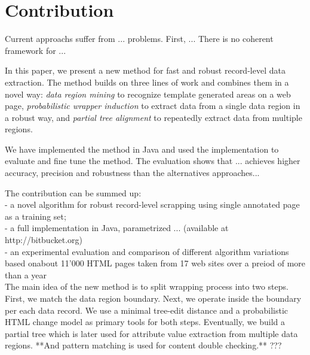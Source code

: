 \section{Contribution}



Current approachs suffer from ... problems. First, ... There is no coherent framework for ...

In this paper, we present a new method for fast and robust record-level data extraction. The method builds on three lines of work and combines them in a novel way: \emph{data region mining} \cite{liu2009a} to recognize template generated areas on a web page, \emph{probabilistic wrapper induction} \cite{DBLP:journals/pvldb/ParameswaranDGR11} to extract data from a single data region in a robust way, and \emph{partial tree alignment} \cite{zhai2005a} to repeatedly extract data from multiple regions. 

We have implemented the method in Java and used the implementation to evaluate and fine tune the method. The evaluation shows that ... achieves higher accuracy, precision and robustness than the alternatives approaches...

The contribution can be summed up: \\
- a novel algorithm for robust record-level scrapping using single annotated page as a training set;\\
- a full implementation in Java, parametrized ... (available at http://bitbucket.org)\\
- an experimental evaluation and comparison of different algorithm variations based onabout 11'000 HTML pages taken from 17 web sites over a preiod of more than a year\\


The main idea of the new method is to split wrapping process into two steps. First, we match the data region boundary. Next, we operate inside the boundary per each data record. We use a minimal tree-edit distance and a probabilistic HTML change model as primary tools for both steps. Eventually, we build a partial tree which is later used for attribute value extraction from multiple data regions. **And pattern matching is used for content double checking.** ???

